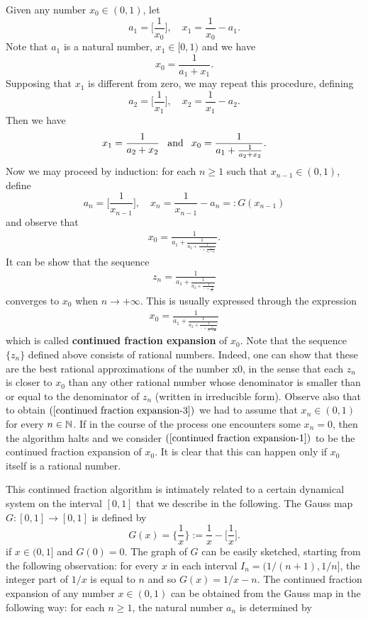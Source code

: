 \begin{example}
Given any number $x_0\in(0,1)$, let
\[a_1=\Big[\frac{1}{x_0}\Big],\quad x_1=\frac{1}{x_0}-a_1.\]
Note that $a_1$ is a natural number, $x_1\in[0,1)$ and we have
\[x_0=\frac{1}{a_1+x_1}.\]
Supposing that $x_1$ is different from zero, we may repeat this procedure, defining
\[a_2=\Big[\frac{1}{x_1}\Big],\quad x_2=\frac{1}{x_1}-a_2.\]
Then we have
\[x_1=\frac{1}{a_2+x_2}\hspace{8pt}\text{and}\hspace{8pt} x_0=\frac{1}{a_1+\frac{1}{a_2+x_2}}.\]
Now we may proceed by induction: for each $n\geq 1$ such that $x_{n-1}\in(0,1)$, define
\[a_n=\Big[\frac{1}{x_{n-1}}\Big],\quad x_n=\frac{1}{x_{n-1}}-a_n=:G(x_{n-1})\]
and observe that
\begin{align}\label{continued fraction expansion-1}
x_0=\frac{1}{a_1+\frac{1}{a_2+\frac{1}{\cdots+\frac{1}{a_n+x_n}}}}.
\end{align}
It can be show that the sequence
\begin{align}\label{continued fraction expansion-2}
z_n=\frac{1}{a_1+\frac{1}{a_2+\frac{1}{\cdots+\frac{1}{a_n}}}}
\end{align}
converges to $x_0$ when $n\to+\infty$. This is usually expressed through the expression
\begin{align}\label{continued fraction expansion-3}
x_0=\frac{1}{a_1+\frac{1}{a_2+\frac{1}{\cdots+\frac{1}{a_n+\frac{1}{\cdots}}}}}
\end{align}
which is called \textbf{continued fraction expansion} of $x_0$. Note that the sequence $\{z_n\}$ defined above consists of rational numbers. Indeed, one can show that these are the best rational approximations of the number x0, in the sense that each $z_n$ is closer to $x_0$ than any other rational number whose denominator is smaller than or equal to the denominator of $z_n$ (written in irreducible form). Observe also that to obtain $(\ref{continued fraction expansion-3})$ we had to assume that $x_n\in(0,1)$ for every $n\in\mathbb{N}$. If in the course of the process one encounters some $x_n=0$, then the algorithm halts and we consider $(\ref{continued fraction expansion-1})$ to be the continued fraction expansion of $x_0$. It is clear that this can happen only if $x_0$ itself is a rational number.\par
This continued fraction algorithm is intimately related to a certain dynamical system on the interval $[0,1]$ that we describe in the following. The Gauss map $G:[0,1]\to[0,1]$ is defined by
\[G(x)=\Big\{\frac{1}{x}\Big\}:=\frac{1}{x}-\Big[\frac{1}{x}\Big].\]
if $x\in(0,1]$ and $G(0)=0$. The graph of $G$ can be easily sketched, starting from the following observation: for every $x$ in each interval $I_n=(1/(n+1),1/n]$, the integer part of $1/x$ is equal to $n$ and so $G(x)=1/x-n$. The continued fraction expansion of any number $x\in(0,1)$ can be obtained from the Gauss map in the following way: for each $n\geq 1$, the natural number $a_n$ is determined by

\end{example}
